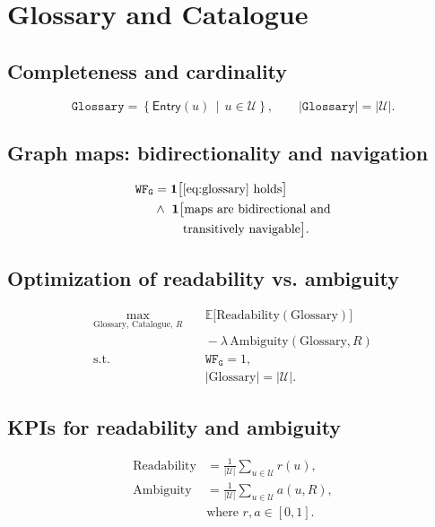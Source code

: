 \documentclass[conference]{IEEEtran}
\begin{document}
\section{Glossary and Catalogue}
\subsection{Completeness and cardinality}
\begin{equation}
\label{eq:glossary}
\mathtt{Glossary}=\left\{\mathsf{Entry}(u)\,\middle|\, u\in\mathcal{U}\right\},\qquad
\left|\mathtt{Glossary}\right|=\left|\mathcal{U}\right|.
\end{equation}

\subsection{Graph maps: bidirectionality and navigation}
\begin{equation}
\label{eq:wf-g}
\begin{aligned}
\mathtt{WF_G}
&=\mathbf{1}\big[\eqref{eq:glossary}\ \text{holds}\big]\\
&\wedge\ \mathbf{1}\big[\text{maps are bidirectional and}\\
&\qquad\ \text{transitively navigable}\big].
\end{aligned}
\end{equation}

\subsection{Optimization of readability vs. ambiguity}
\begin{equation}
\label{eq:gloss-obj}
\begin{aligned}
\max_{\text{Glossary},\,\text{Catalogue},\,R}\quad
& \mathbb{E}\!\big[\mathrm{Readability}(\text{Glossary})\big] \\
& {}-\lambda\,\mathrm{Ambiguity}(\text{Glossary},R) \\
\text{s.t.}\quad
& \mathtt{WF_G}=1, \\
& |\text{Glossary}|=|\mathcal{U}|.
\end{aligned}
\end{equation}

\subsection{KPIs for readability and ambiguity}
\begin{equation}
\label{eq:read-amb-kpi}
\begin{aligned}
\mathrm{Readability} &= \frac{1}{|\mathcal{U}|}\sum_{u\in\mathcal{U}} r(u),\\
\mathrm{Ambiguity}   &= \frac{1}{|\mathcal{U}|}\sum_{u\in\mathcal{U}} a(u,R),\\
&\text{where } r,a\in[0,1].
\end{aligned}
\end{equation}
\end{document}
